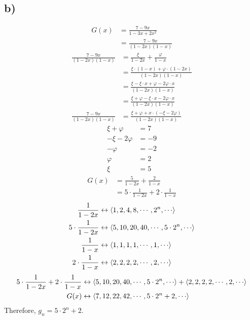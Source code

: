 \documentclass[12pt]{article}
\newcommand{\+}{\mkern2mu}
\begin{document}
\subsection*{b) }
\begin{align*}
G(x) &= \frac{7-9x}{1-3x+2x^2} \\
&= \frac{7-9x}{(1-2x)(1-x)}
\end{align*}
\begin{align*}
\frac{7-9x}{(1-2x)(1-x)} &= \frac{\xi}{1-2x} + \frac{\varphi}{1-x} \\
&= \frac{\xi \cdot (1-x) + \varphi \cdot (1-2x)}{(1-2x)(1-x)} \\
&= \frac{\xi - \xi \cdot x + \varphi - 2 \varphi \cdot x}{(1-2x)(1-x)} \\
&= \frac{\xi + \varphi - \xi \cdot x - 2 \varphi \cdot x}{(1-2x)(1-x)} \\
\frac{7-9x}{(1-2x)(1-x)} &= \frac{\xi + \varphi + x \cdot (- \xi - 2 \varphi)}{(1-2x)(1-x)}
\end{align*}
\begin{align*}
\xi + \varphi &= 7 \\
-\xi - 2\varphi &= -9 \\
-\varphi &= -2 \\
\varphi &= 2 \\
\xi &= 5
\end{align*}
\begin{align*}
G(x) &= \frac{5}{1-2x} + \frac{2}{1-x} \\
&= 5 \cdot \frac{1}{1-2x} + 2 \cdot \frac{1}{1-x}
\end{align*}
\begin{align*}
\frac{1}{1-2x} &\leftrightarrow \Braket{1, 2, 4, 8, \cdots, 2^n, \cdots} \\
5 \cdot \frac{1}{1-2x} &\leftrightarrow \Braket{5, 10, 20, 40, \cdots, 5 \cdot 2^n, \cdots} \\
\frac{1}{1-x} &\leftrightarrow \Braket{1, 1, 1, 1, \cdots, 1, \cdots} \\
2 \cdot \frac{1}{1-x} &\leftrightarrow \Braket{2, 2, 2, 2, \cdots, 2, \cdots}
\end{align*}
\begin{align*}
5 \cdot \frac{1}{1-2x} + 2 \cdot \frac{1}{1-x} &\leftrightarrow \Braket{5, 10, 20, 40, \cdots, 5 \cdot 2^n, \cdots} + \Braket{2, 2, 2, 2, \cdots, 2, \cdots} \\
G(x) &\leftrightarrow \Braket{7, 12, 22, 42, \cdots, 5 \cdot 2^n + 2, \cdots} \\
\end{align*}
Therefore, $g_n = 5 \cdot 2^n + 2$.
\end{document}
